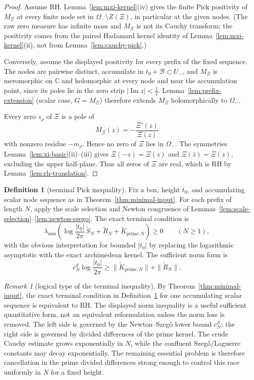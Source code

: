 \documentclass[11pt]{amsart}
\theoremstyle{definition}
\newtheorem{definition}[theorem]{Definition}
\theoremstyle{remark}
\newtheorem{remark}[theorem]{Remark}
\theoremstyle{definition}
\renewcommand{\Im}{\operatorname{Im}}
\newcommand{\half}{\tfrac{1}{2}}
\newcommand{\C}{\mathbb{C}}
\begin{document}
\begin{proof}
Assume RH.  Lemma~\ref{lem:mxi-kernel}(iv) gives the finite Pick positivity of $M_\Xi$ at every finite
node set in $\Omega_-\setminus Z(\Xi)$, in particular at the given nodes.  (The raw zero measure has
infinite mass and $M_\Xi$ is not its Cauchy transform; the positivity comes from the paired Hadamard
kernel identity of Lemma~\ref{lem:mxi-kernel}(ii), not from Lemma~\ref{lem:cauchy-pick}.)

Conversely, assume the displayed positivity for every prefix of the fixed sequence.  The nodes are
pairwise distinct, accumulate in $t_0+\mathcal B\subset U_-$, and $M_\Xi$ is meromorphic on $\C$ and
holomorphic at every node and near the accumulation point, since its poles lie in the zero strip
$|\Im z|<\half$.  Lemma~\ref{lem:prefix-extension} (scalar case, $G=M_\Xi$) therefore extends $M_\Xi$
holomorphically to $\Omega_-$.

Every zero $z_\rho$ of $\Xi$ is a pole of
\[
   M_\Xi(z)=-\frac{\Xi'(z)}{\Xi(z)}
\]
with nonzero residue $-m_\rho$.  Hence no zero of $\Xi$ lies in $\Omega_-$.  The symmetries
Lemma~\ref{lem:xi-basic}(ii)--(iii) gives $\Xi(-z)=\Xi(z)$ and
$\Xi(\bar z)=\overline{\Xi(z)}$, excluding the upper half-plane.  Thus all zeros of $\Xi$ are real,
which is RH by Lemma~\ref{lem:rh-translation}.
\end{proof}

\begin{definition}[terminal Pick inequality]\label{def:terminal-inequality}
Fix a box, height $t_0$, and accumulating scalar node sequence as in
Theorem~\ref{thm:minimal-input}.  For each prefix of length $N$, apply the scale selection and Newton
congruence of Lemmas~\ref{lem:scale-selection}--\ref{lem:newton-szego}.  The exact terminal condition is
\[
   \lambda_{\min}\!\left(
      \log\frac{|t_0|}{2\pi}\,\widetilde S_N
      +\widetilde R_N
      +\widetilde K_{\mathrm{prime},N}
   \right)\ge0
   \qquad(N\ge1),
\]
with the obvious interpretation for bounded $|t_0|$ by replacing the logarithmic asymptotic with the
exact archimedean kernel.  The sufficient norm form is
\[
   c_N^{\mathcal S}\log\frac{|t_0|}{2\pi}
   \ge
   \|\widetilde K_{\mathrm{prime},N}\|
   +
   \|\widetilde R_N\|.
\]
\end{definition}

\begin{remark}[logical type of the terminal inequality]\label{rmk:terminal-status}
By Theorem~\ref{thm:minimal-input}, the exact terminal condition in
Definition~\ref{def:terminal-inequality} for one accumulating scalar sequence is equivalent to RH.
The displayed norm inequality is a useful sufficient quantitative form, not an equivalent reformulation
unless the norm loss is removed.  The left side is governed by the Newton--Szeg\H{o} lower bound
$c_N^{\mathcal S}$; the right side is governed by divided differences of the prime kernel.  The crude
Cauchy estimate grows exponentially in $N$, while the confluent Szeg\H{o}/Laguerre constants may decay
exponentially.  The remaining essential problem is therefore cancellation in the prime divided
differences strong enough to control this race uniformly in $N$ for a fixed height.
\end{remark}
\end{document}
